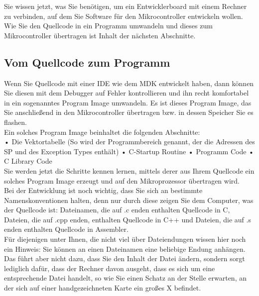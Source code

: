 Sie wissen jetzt, was Sie benötigen, um ein Entwicklerboard mit einem Rechner zu verbinden, auf dem Sie Software für den Mikrocontroller entwickeln wollen.\\

Wie Sie den Quellcode in ein Programm umwandeln und dieses zum Mikrocontroller übertragen ist Inhalt der nächsten Abschnitte.

\subsection{Vom Quellcode zum Programm}

Wenn Sie Quellcode mit einer IDE wie dem MDK entwickelt haben, dann können Sie diesen mit dem Debugger auf Fehler kontrollieren und ihn recht komfortabel in ein sogenanntes Program Image umwandeln. Es ist dieses Program Image, das Sie anschließend in den Mikrocontroller übertragen bzw. in dessen Speicher Sie es flashen.\\

Ein solches Program Image beinhaltet die folgenden Abschnitte:\\

•	Die Vektortabelle (So wird der Programmbereich genannt, der die Adressen des SP und des Exception Types enthält)
•	C-Startup Routine
•	Programm Code
•	C Library Code\\

Sie werden jetzt die Schritte kennen lernen, mittels derer aus Ihrem Quellcode ein solches Program Image erzeugt und auf den Mikroprozessor übertragen wird.\\

Bei der Entwicklung ist noch wichtig, dass Sie sich an bestimmte Namenskonventionen halten, denn nur durch diese zeigen Sie dem Computer, was der Quellcode ist: Dateinamen, die auf .c enden enthalten Quellcode in C, Dateien, die auf .cpp enden, enthalten Quellcode in C++ und Dateien, die auf .s enden enthalten Quellcode in Assembler. \\

Für diejenigen unter Ihnen, die nicht viel über Dateiendungen wissen hier noch ein Hinweis: Sie können an einen Dateinamen eine beliebige Endung anhängen. Das führt aber nicht dazu, dass Sie den Inhalt der Datei ändern, sondern sorgt lediglich dafür, dass der Rechner davon ausgeht, dass es sich um eine entsprechende Datei handelt, so wie Sie einen Schatz an der Stelle erwarten, an der sich auf einer handgezeichneten Karte ein großes X befindet.\\

